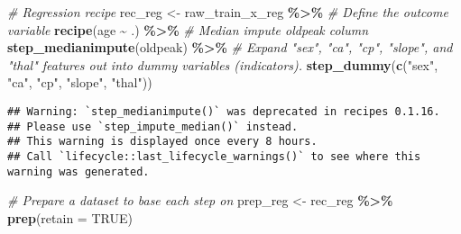 \documentclass[
]{book}
\newenvironment{Shaded}{\begin{snugshade}}{\end{snugshade}}
\newcommand{\CommentTok}[1]{\textcolor[rgb]{0.56,0.35,0.01}{\textit{#1}}}
\newcommand{\DataTypeTok}[1]{\textcolor[rgb]{0.13,0.29,0.53}{#1}}
\newcommand{\KeywordTok}[1]{\textcolor[rgb]{0.13,0.29,0.53}{\textbf{#1}}}
\newcommand{\NormalTok}[1]{#1}
\newcommand{\OperatorTok}[1]{\textcolor[rgb]{0.81,0.36,0.00}{\textbf{#1}}}
\newcommand{\OtherTok}[1]{\textcolor[rgb]{0.56,0.35,0.01}{#1}}
\newcommand{\StringTok}[1]{\textcolor[rgb]{0.31,0.60,0.02}{#1}}
\begin{document}
\begin{Shaded}
\begin{Highlighting}[]
\CommentTok{\# Regression recipe}
\NormalTok{rec\_reg \textless{}{-}}\StringTok{ }\NormalTok{raw\_train\_x\_reg }\OperatorTok{\%\textgreater{}\%}
\StringTok{  }\CommentTok{\# Define the outcome variable}
\StringTok{  }\KeywordTok{recipe}\NormalTok{(age }\OperatorTok{\textasciitilde{}}\StringTok{ }\NormalTok{.) }\OperatorTok{\%\textgreater{}\%}
\StringTok{  }\CommentTok{\# Median impute oldpeak column}
\StringTok{  }\KeywordTok{step\_medianimpute}\NormalTok{(oldpeak) }\OperatorTok{\%\textgreater{}\%}
\StringTok{  }\CommentTok{\# Expand "sex", "ca", "cp", "slope", and "thal" features out into dummy variables (indicators).}
\StringTok{  }\KeywordTok{step\_dummy}\NormalTok{(}\KeywordTok{c}\NormalTok{(}\StringTok{"sex"}\NormalTok{, }\StringTok{"ca"}\NormalTok{, }\StringTok{"cp"}\NormalTok{, }\StringTok{"slope"}\NormalTok{, }\StringTok{"thal"}\NormalTok{))}
\end{Highlighting}
\end{Shaded}

\begin{verbatim}
## Warning: `step_medianimpute()` was deprecated in recipes 0.1.16.
## Please use `step_impute_median()` instead.
## This warning is displayed once every 8 hours.
## Call `lifecycle::last_lifecycle_warnings()` to see where this warning was generated.
\end{verbatim}

\begin{Shaded}
\begin{Highlighting}[]
\CommentTok{\# Prepare a dataset to base each step on}
\NormalTok{prep\_reg \textless{}{-}}\StringTok{ }\NormalTok{rec\_reg }\OperatorTok{\%\textgreater{}\%}\StringTok{ }\KeywordTok{prep}\NormalTok{(}\DataTypeTok{retain =} \OtherTok{TRUE}\NormalTok{)}
\end{Highlighting}
\end{Shaded}
\end{document}
